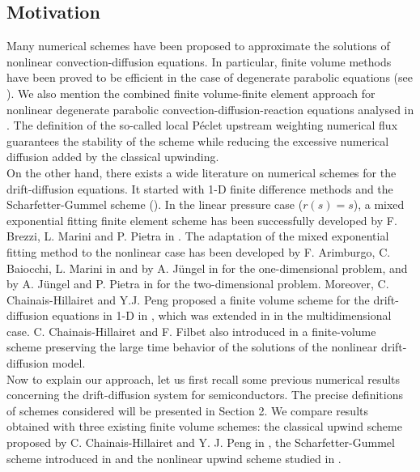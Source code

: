 \documentclass[smallextended]{svjour3}
\begin{document}

\subsection{Motivation}

Many numerical schemes have been proposed to approximate the solutions of nonlinear con\-vection-diffusion equations. In particular, finite volume methods have been proved to be efficient in the case of degenerate parabolic equations (see \cite{Eymard2000,Eymard2002}). We also mention the combined finite volume-finite element approach for nonlinear degenerate parabolic convection-diffusion-reaction equations analysed in \cite{Eymard2006a}. The definition of the so-called local Péclet upstream weighting numerical flux guarantees the stability of the scheme while reducing the excessive numerical diffusion added by the classical upwinding.\\
On the other hand, there exists a wide literature on numerical schemes for the drift-diffusion equations. It started with 1-D finite difference methods and the Scharfetter-Gummel scheme (\cite{Scharfetter1969}). In the linear pressure case ($r(s)=s$), a mixed exponential fitting finite element scheme has been successfully developed by F. Brezzi, L. Marini and P. Pietra in \cite{Brezzi1987,Brezzi1989}. The adaptation of the mixed exponential fitting method to the nonlinear case has been developed by F. Arimburgo, C. Baiocchi, L. Marini in \cite{Arimburgo1992} and by A. Jüngel in \cite{Juengel1995} for the one-dimensional problem, and by A. Jüngel and P. Pietra in \cite{Juengel1997} for the two-dimensional problem. Moreover, C. Chainais-Hillairet and Y.J. Peng proposed a finite volume scheme for the drift-diffusion equations in 1-D in \cite{Chainais-Hillairet2003a}, which was extended in \cite{Chainais-Hillairet2003,Chainais-Hillairet2004} in the multidimensional case. C. Chainais-Hillairet and F. Filbet also introduced in \cite{Chainais-Hillairet2007} a finite-volume scheme preserving the large time behavior of the solutions of the nonlinear drift-diffusion model.\\ 
Now to explain our approach, let us first recall some previous numerical results concerning the drift-diffusion system for semiconductors. The precise definitions of schemes considered will be presented in Section 2. We compare results obtained with three existing finite volume schemes: the classical upwind scheme proposed by C. Chainais-Hillairet and Y. J. Peng in \cite{Chainais-Hillairet2003a}, the Scharfetter-Gummel scheme introduced in \cite{Scharfetter1969} and the nonlinear upwind scheme studied in \cite{Chainais-Hillairet2007}.\\
\end{document}
